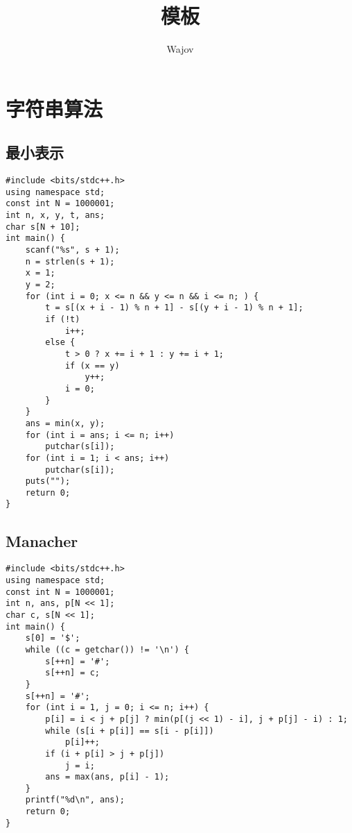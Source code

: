 \documentclass[a4paper]{article}
\title{模板}
\author{Wajov}
\begin{document}
\maketitle
\renewcommand{\contentsname}{目录}
\tableofcontents
\newpage
{}
\newfontfamily{}
\section{字符串算法}
\subsection{最小表示}
\begin{lstlisting}
#include <bits/stdc++.h>
using namespace std;
const int N = 1000001;
int n, x, y, t, ans;
char s[N + 10];
int main() {
    scanf("%s", s + 1);
    n = strlen(s + 1);
    x = 1;
    y = 2;
    for (int i = 0; x <= n && y <= n && i <= n; ) {
        t = s[(x + i - 1) % n + 1] - s[(y + i - 1) % n + 1];
        if (!t)
            i++;
        else {
            t > 0 ? x += i + 1 : y += i + 1;
            if (x == y)
                y++;
            i = 0;
        }
    }
    ans = min(x, y);
    for (int i = ans; i <= n; i++)
        putchar(s[i]);
    for (int i = 1; i < ans; i++)
        putchar(s[i]);
    puts("");
    return 0;
}
\end{lstlisting}
\subsection{Manacher}
\begin{lstlisting}
#include <bits/stdc++.h>
using namespace std;
const int N = 1000001;
int n, ans, p[N << 1];
char c, s[N << 1];
int main() {
    s[0] = '$';
    while ((c = getchar()) != '\n') {
        s[++n] = '#';
        s[++n] = c;
    }
    s[++n] = '#';
    for (int i = 1, j = 0; i <= n; i++) {
        p[i] = i < j + p[j] ? min(p[(j << 1) - i], j + p[j] - i) : 1;
        while (s[i + p[i]] == s[i - p[i]])
            p[i]++;
        if (i + p[i] > j + p[j])
            j = i;
        ans = max(ans, p[i] - 1);
    }
    printf("%d\n", ans);
    return 0;
}
\end{lstlisting}
\end{document}
